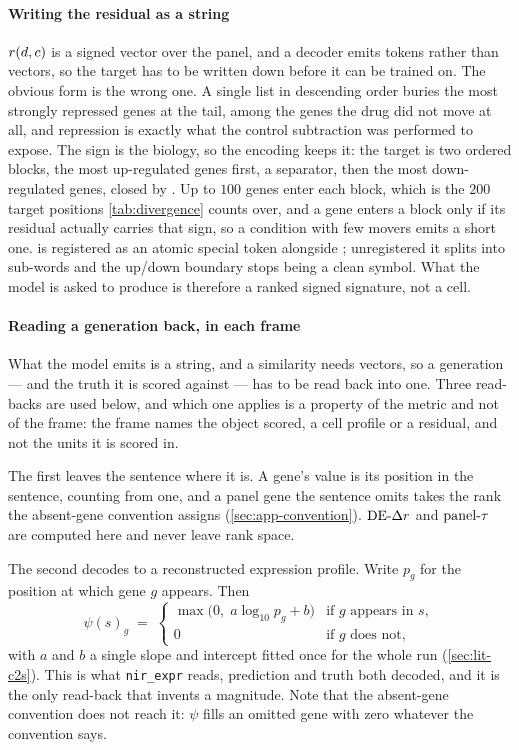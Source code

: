 \paragraph{Writing the residual as a string} $r(d,c)$ is a signed vector
over the panel, and a decoder emits tokens rather than vectors, so the target has
to be written down before it can be trained on. The obvious form is the wrong
one. A single list in descending order buries the most strongly repressed genes
at the tail, among the genes the drug did not move at all, and repression is
exactly what the control subtraction was performed to expose. The sign is the
biology, so the encoding keeps it: the target is two ordered blocks, the most
up-regulated genes first, a \DOWN{} separator, then the most down-regulated
genes, closed by \ENDCELL{}. Up to $100$ genes enter each block, which is the
$200$ target positions \cref{tab:divergence} counts over, and a gene enters a
block only if its residual actually carries that sign, so a condition with few
movers emits a short one. \DOWN{} is registered as an atomic special token
alongside \ENDCELL{}; unregistered it splits into sub-words and the up/down
boundary stops being a clean symbol. What the model is asked to produce is
therefore a ranked signed signature, not a cell.

\paragraph{Reading a generation back, in each frame} What the model emits is a
string, and a similarity needs vectors, so a generation --- and the truth it is
scored against --- has to be read back into one. Three read-backs are used below,
and which one applies is a property of the metric and not of the frame: the frame
names the object scored, a cell profile or a residual, and not the units it is
scored in.

The first leaves the sentence where it is. A gene's value is its position in the
sentence, counting from one, and a panel gene the sentence omits takes the rank
the absent-gene convention assigns (\cref{sec:app-convention}). $\textrm{DE-}\Delta r$ and
$\textrm{panel-}\tau$ are computed here and never leave rank space.

The second decodes to a reconstructed expression profile. Write $p_g$ for the
position at which gene $g$ appears. Then
\begin{equation}
 \psi(s)_g \;=\;
 \begin{cases}
   \max\!\big(0,\; a\log_{10} p_g + b\big) & \text{if $g$ appears in $s$},\\[2pt]
   0 & \text{if $g$ does not,}
 \end{cases}
\end{equation}
with $a$ and $b$ a single slope and intercept fitted once for the whole run
(\cref{sec:lit-c2s}). This is what \texttt{nir\_expr} reads, prediction and truth
both decoded, and it is the only read-back that invents a magnitude. Note that
the absent-gene convention does not reach it: $\psi$ fills an omitted gene with
zero whatever the convention says.

